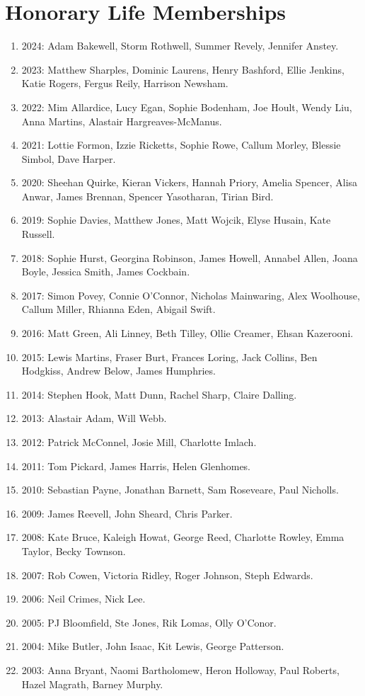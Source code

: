 \documentclass[12pt]{article}
\begin{document}
\section{Honorary Life Memberships}
\begin{enumerate}[]
    \item 2024: Adam Bakewell, Storm Rothwell, Summer Revely, Jennifer Anstey.
    \item 2023: Matthew Sharples, Dominic Laurens, Henry Bashford, Ellie Jenkins, Katie Rogers, Fergus Reily, Harrison Newsham.
    \item 2022: Mim Allardice, Lucy Egan, Sophie Bodenham, Joe Hoult, Wendy Liu, Anna Martins, Alastair Hargreaves-McManus.
    \item 2021: Lottie Formon, Izzie Ricketts, Sophie Rowe, Callum Morley, Blessie Simbol, Dave Harper.
    \item 2020: Sheehan Quirke, Kieran Vickers, Hannah Priory, Amelia Spencer, Alisa Anwar, James Brennan, Spencer Yasotharan, Tirian Bird.
    \item 2019: Sophie Davies, Matthew Jones, Matt Wojcik, Elyse Husain, Kate Russell.
    \item 2018: Sophie Hurst, Georgina Robinson, James Howell, Annabel Allen, Joana Boyle, Jessica Smith, James Cockbain.
    \item 2017: Simon Povey, Connie O’Connor, Nicholas Mainwaring, Alex Woolhouse, Callum Miller, Rhianna Eden, Abigail Swift.
    \item 2016: Matt Green, Ali Linney, Beth Tilley, Ollie Creamer, Ehsan Kazerooni.
    \item 2015: Lewis Martins, Fraser Burt, Frances Loring, Jack Collins, Ben Hodgkiss, Andrew Below, James Humphries.
    \item 2014: Stephen Hook, Matt Dunn, Rachel Sharp, Claire Dalling.
    \item 2013: Alastair Adam, Will Webb.
    \item 2012: Patrick McConnel, Josie Mill, Charlotte Imlach.
    \item 2011: Tom Pickard, James Harris, Helen Glenhomes.
    \item 2010: Sebastian Payne, Jonathan Barnett, Sam Roseveare, Paul Nicholls.
    \item 2009: James Reevell, John Sheard, Chris Parker.
    \item 2008: Kate Bruce, Kaleigh Howat, George Reed, Charlotte Rowley, Emma Taylor, Becky Townson.
    \item 2007: Rob Cowen, Victoria Ridley, Roger Johnson, Steph Edwards.
    \item 2006: Neil Crimes, Nick Lee.
    \item 2005: PJ Bloomfield, Ste Jones, Rik Lomas, Olly O’Conor.
    \item 2004: Mike Butler, John Isaac, Kit Lewis, George Patterson.
    \item 2003: Anna Bryant, Naomi Bartholomew, Heron Holloway, Paul Roberts, Hazel Magrath, Barney Murphy.

\end{enumerate}
\end{document}
